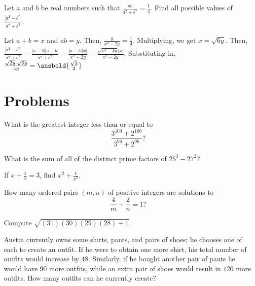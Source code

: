 \documentclass[mast]{lucky}
\begin{document}
\begin{exam}
Let $a$ and $b$ be real numbers such that $\frac{ab}{a^2+b^2}=\frac{1}{4}$. Find all possible values of $\frac{|a^2-b^2|}{a^2+b^2}$.
\end{exam}

\begin{sol}
Let $a+b=x$ and $ab=y$. Then, $\frac{y}{x^2-2y}=\frac{1}{4}$. Multiplying, we get $x=\sqrt{6y}$. Then, $\frac{|a^2-b^2|}{a^2+b^2}=\frac{|a-b||a+b|}{a^2+b^2}=\frac{|a-b||x|}{x^2-2y}=\frac{\sqrt{x^2-4y}|x|}{x^2-2y}$. Substituting in,$\frac{\sqrt{2y}\cdot \sqrt{6y}}{4y}=\ansbold{\frac{\sqrt{3}}{2}}$
\end{sol}


\pagebreak\section{Problems}

\minpt{}


\begin{prob}[AMC 10A 2018/14]{2}
What is the greatest integer less than or equal to\[\frac{3^{100}+2^{100}}{3^{96}+2^{96}}?\]
\end{prob}

\begin{prob}{2}
What is the sum of all of the distinct prime factors of $25^3 - 27^2$?
\end{prob}

\begin{prob}[Classical]{2}
If $x+\frac{1}{x} = 3$, find $x^2+\frac{1}{x^2}$.
\end{prob}

\begin{prob}[AHMSE 1993/19]{2}
How many ordered pairs $(m,n)$ of positive integers are solutions to
\[\frac{4}{m}+\frac{2}{n}=1?\]
\end{prob}

\begin{prob}[1989 AIME/1]{2}
Compute $\sqrt{(31)(30)(29)(28)+1}$.
\end{prob}

\begin{prob}[2008-2009 Mandelbrot]{3}
Austin currently owns some shirts, pants, and pairs of shoes; he chooses one of each to create an outfit. If he were to obtain one more shirt, his total number of outfits would increase by $48.$ Similarly, if he bought another pair of pants he would have $90$ more outfits, while an extra pair of shoes would result in $120$ more outfits. How many outfits can he currently create?
\end{prob}
  
\end{document}
